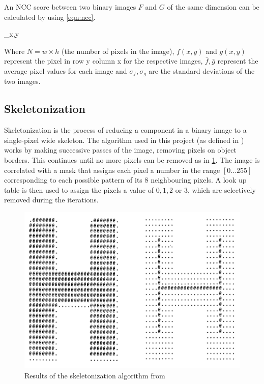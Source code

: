 An NCC score between two binary images $F$ and $G$ of the same dimension can be calculated by using \cref{eqn:ncc}.

\begin{lequation}\label{eqn:ncc}
   \sum_{x,y} 
\end{lequation}

Where $N = w \times h$ (the number of pixels in the image), $f(x,y)$ and $g(x, y)$ represent the pixel in row y column x for the respective images, $\bar{f}, \bar{g}$ represent the average pixel values for each image and $\sigma_{f},  \sigma_{g}$ are the standard deviations of the two images. 

\subsection{Skeletonization}
\label{sec:skeletonization}

Skeletonization is the process of reducing a component in a binary image to a single-pixel wide skeleton. The algorithm used in this project (as defined in \cite{zhang1984fast}) works by making successive passes of the image, removing pixels on object borders. This continues until no more pixels can be removed as in \cref{fig:skeletonization-example}.  The image is correlated with a mask that assigns each pixel a number in the range $[0...255]$ corresponding to each possible pattern of its $8$ neighbouring pixels. A look up table is then used to assign the pixels a value of $0, 1, 2$ or $3$, which are selectively removed during the iterations.

\begin{figure}[H]
  \includegraphics{gfx/skeletonization.png}
  \caption{Results of the skeletonization algorithm from \cite{zhang1984fast}}
  \label{fig:skeletonization-example}
\end{figure}


